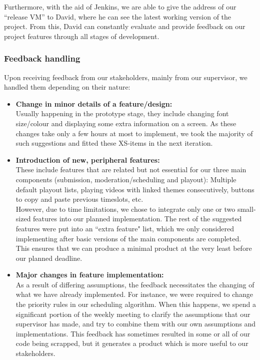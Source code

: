\documentclass[a4paper, titlepage]{article}
\begin{document}
Furthermore, with the aid of Jenkins, we are able to give the address of our ``release VM'' to David, where he can see the latest working version of the project. From this, David can constantly evaluate and provide feedback on our project features through all stages of development.

\subsubsection{Feedback handling}

Upon receiving feedback from our stakeholders, mainly from our supervisor, we handled them depending on their nature:

\begin{itemize}

  \item \textbf{Change in minor details of a feature/design:} \\
        Usually happening in the prototype stage, they include changing font size/colour and displaying some extra information on a screen. As these changes take only a few hours at most to implement, we took the majority of such suggestions and fitted these XS-items in the next iteration.

  \item \textbf{Introduction of new, peripheral features:} \\
        These include features that are related but not essential for our three main components (submission, moderation/scheduling and playout): Multiple default playout lists, playing videos with linked themes consecutively, buttons to copy and paste previous timeslots, etc. \\
        However, due to time limitations, we chose to integrate only one or two small-sized features into our planned implementation. The rest of the suggested features were put into an ``extra feature" list, which we only considered implementing after basic versions of the main components are completed. This ensures that we can produce a minimal product at the very least before our planned deadline.

  \item \textbf{Major changes in feature implementation:} \\
        As a result of differing assumptions, the feedback necessitates the changing of what we have already implemented. For instance, we were required to change the priority rules in our scheduling algorithm. When this happens, we spend a significant portion of the weekly meeting to clarify the assumptions that our supervisor has made, and try to combine them with our own assumptions and implementations. This feedback has sometimes resulted in some or all of our code being scrapped, but it generates a product which is more useful to our stakeholders.

\end{itemize}
\end{document}
